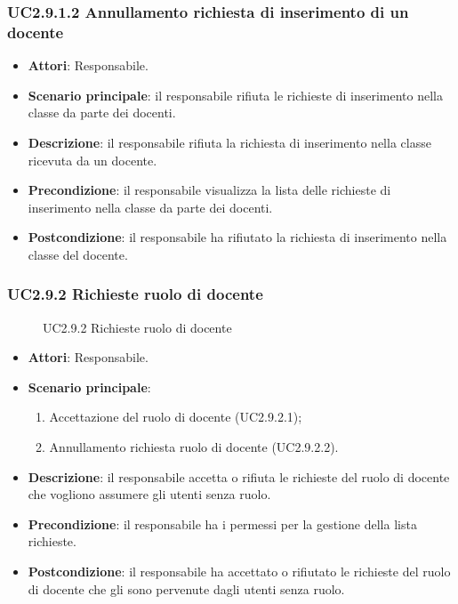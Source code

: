 \subsubsection{UC2.9.1.2 Annullamento richiesta di inserimento di un docente}
\begin{itemize}
\item \textbf{Attori}: Responsabile.
\item \textbf{Scenario principale}: il responsabile rifiuta le richieste di inserimento nella classe da parte dei docenti.
\item \textbf{Descrizione}: il responsabile rifiuta la richiesta di inserimento nella classe ricevuta da un docente.
\item \textbf{Precondizione}: il responsabile visualizza la lista delle richieste di inserimento nella classe da parte dei docenti.
\item \textbf{Postcondizione}: il responsabile ha rifiutato la richiesta di inserimento nella classe del docente.
\end{itemize}
\subsubsection{UC2.9.2 Richieste ruolo di docente}
\begin{figure}[H]
\centering
\noindent{}
\caption{UC2.9.2 Richieste ruolo di docente}
\end{figure}
\begin{itemize}
\item \textbf{Attori}: Responsabile.
\item \textbf{Scenario principale}:
\begin{enumerate}
\item Accettazione del ruolo di docente (UC2.9.2.1);
\item Annullamento richiesta ruolo di docente (UC2.9.2.2).
\end{enumerate}
\item \textbf{Descrizione}: il responsabile accetta o rifiuta le richieste del ruolo di docente che vogliono assumere gli utenti senza ruolo.
\item \textbf{Precondizione}: il responsabile ha i permessi per la gestione della lista richieste.
\item \textbf{Postcondizione}: il responsabile ha accettato o rifiutato le richieste del ruolo di docente che gli sono pervenute dagli utenti senza ruolo.
\end{itemize}
